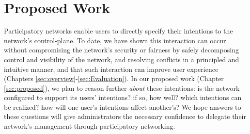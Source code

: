 \begin{comment}

\vskip 0.5em

In summary, this thesis makes the following contributions:

\begin{enumerate}


\item We implement a fully-functioning SDN controller which allows a
network's administrators to safely delegate their authority using our API.

\item We analyze a previously proposed algorithm for consolidating
hierarchical policies, and propose a new algorithm that reduces the complexity
from exponential to polynomial.

\item We demonstrate our system's usefulness and
practicality on a real OpenFlow testbed using 
microbenchmarks and four real applications enhanced with our API.


\end{enumerate}

\end{comment}

\section{Proposed Work}

Participatory networks enable users to directly specify their intentions to
the network's control-plane. To date, we have shown this interaction
can occur without compromising the network's security or fairness by
safely decomposing control and visibility of the network, and resolving 
conflicts in a principled and intuitive manner, and that such interaction
can improve user experience (Chapters \ref{sec:overview}-\ref{sec:Evaluation}).
In our proposed work (Chapter \ref{sec:proposed}), we plan to reason further \emph{about} these intentions:
is the network configured to support its users' intentions? if so, how well?
which intentions can be realized? how will one user's intentions affect another's?
We hope answers to these questions will give administrators the necessary confidence to
delegate their network's management through participatory networking.
